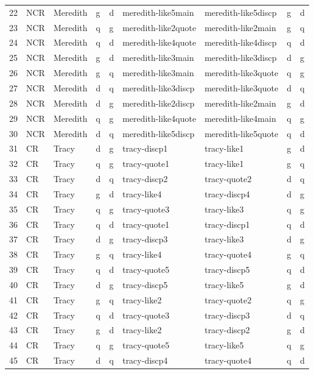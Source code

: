 \begin{table}[htbp]
\begin{center}
{\begin{tabular}{lllllllll}
22	& NCR	& Meredith	& g	& d	& meredith-like5main	& meredith-like5discp	& g	& d \\
23	& NCR	& Meredith	& q	& g	& meredith-like2quote	& meredith-like2main	& g	& q \\
24	& NCR	& Meredith	& q	& d	& meredith-like4quote	& meredith-like4discp	& q	& d \\
25	& NCR	& Meredith	& g	& d	& meredith-like3main	& meredith-like3discp	& d	& g \\
26	& NCR	& Meredith	& g	& q	& meredith-like3main	& meredith-like3quote	& q	& g \\
27	& NCR	& Meredith	& d	& q	& meredith-like3discp	& meredith-like3quote	& d	& q \\
28	& NCR	& Meredith	& d	& g	& meredith-like2discp	& meredith-like2main	& g	& d \\
29	& NCR	& Meredith	& q	& g	& meredith-like4quote	& meredith-like4main	& q	& g \\
30	& NCR	& Meredith	& d	& q	& meredith-like5discp	& meredith-like5quote	& q	& d \\
31	& CR	& Tracy	& d	& g	& tracy-discp1	& tracy-like1	& g	& d \\
32	& CR	& Tracy	& q	& g	& tracy-quote1	& tracy-like1	& g	& q \\
33	& CR	& Tracy	& d	& q	& tracy-discp2	& tracy-quote2	& d	& q \\
34	& CR	& Tracy	& g	& d	& tracy-like4	& tracy-discp4	& d	& g \\
35	& CR	& Tracy	& q	& g	& tracy-quote3	& tracy-like3	& q	& g \\
36	& CR	& Tracy	& q	& d	& tracy-quote1	& tracy-discp1 &	q &	d \\
37	& CR	& Tracy	& d	& g	& tracy-discp3	& tracy-like3	& d	& g \\
38	& CR	& Tracy	& g	& q	& tracy-like4	& tracy-quote4	& g	& q \\
39	& CR	& Tracy	& q	& d	& tracy-quote5	& tracy-discp5	& q	& d \\
40	& CR	& Tracy	& d	& g	& tracy-discp5	& tracy-like5	& g	& d \\
41	& CR	& Tracy	& g	& q	& tracy-like2	& tracy-quote2	& q	& g \\
42	& CR	& Tracy	& q	& d	& tracy-quote3	& tracy-discp3	& d	& q \\
43	& CR	& Tracy	& g	& d	& tracy-like2	& tracy-discp2	& g	& d \\
44	& CR	& Tracy	& q	& g	& tracy-quote5	& tracy-like5	& q	& g \\
45	& CR	& Tracy	& d	& q	& tracy-discp4	& tracy-quote4	& q	& d \\

\end{tabular}}
\end{center}
\end{table}
